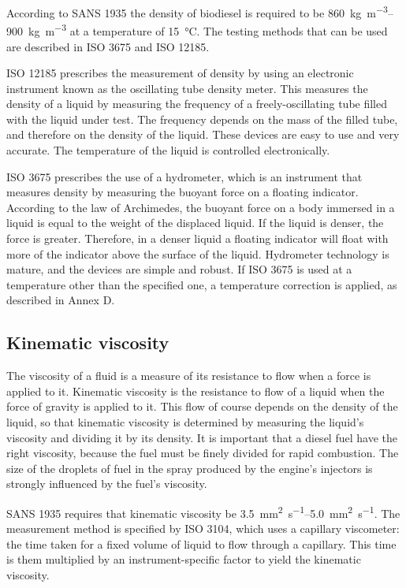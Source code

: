 According to SANS 1935 the density of biodiesel is required to be
\SIrange{860}{900}{\kilogram\per\cubic\metre} at a temperature of
\SI{15}{\celsius}. The testing methods that can be used are described in ISO
3675 and ISO 12185.

ISO 12185 prescribes the measurement of density by using an electronic
instrument known as the oscillating tube density meter. This measures the
density of a liquid by measuring the frequency of a freely-oscillating tube
filled with the liquid under test. The frequency depends on the mass of the
filled tube, and therefore on the density of the liquid.
These devices are easy to use and very accurate. The temperature of the liquid
is controlled electronically.

ISO 3675 prescribes the use of a hydrometer, which is an instrument that
measures density by measuring the buoyant force on a floating indicator.
According to the law of Archimedes, the buoyant force on a body immersed in a
liquid is equal to the weight of the displaced liquid. If the liquid is denser,
the force is greater. Therefore, in a denser liquid a floating indicator will
float with more of the indicator above the surface of the liquid. Hydrometer
technology is mature, and the devices are simple and robust.  If ISO 3675 is
used at a temperature other than the specified one, a temperature correction is
applied, as described in Annex D.

\subsection{Kinematic viscosity}

The viscosity of a fluid is a measure of its resistance to flow when a force is
applied to it. Kinematic viscosity is the resistance to flow of a liquid when
the force of gravity is applied to it. This flow of course depends on the
density of the liquid, so that kinematic viscosity is determined by measuring
the liquid's viscosity and dividing it by its density. It is important that a
diesel fuel have the right viscosity, because the fuel must be finely divided
for rapid combustion. The size of the droplets of fuel in the spray produced by
the engine's injectors is strongly influenced by the fuel's viscosity.

SANS 1935 requires that kinematic viscosity be
\SIrange{3.5}{5.0}{\milli\metre\squared\per\second}. The measurement method is
specified by ISO 3104, which uses a capillary viscometer: the time taken for a
fixed volume of liquid to flow through a capillary. This time is them multiplied
by an instrument-specific factor to yield the kinematic viscosity.

